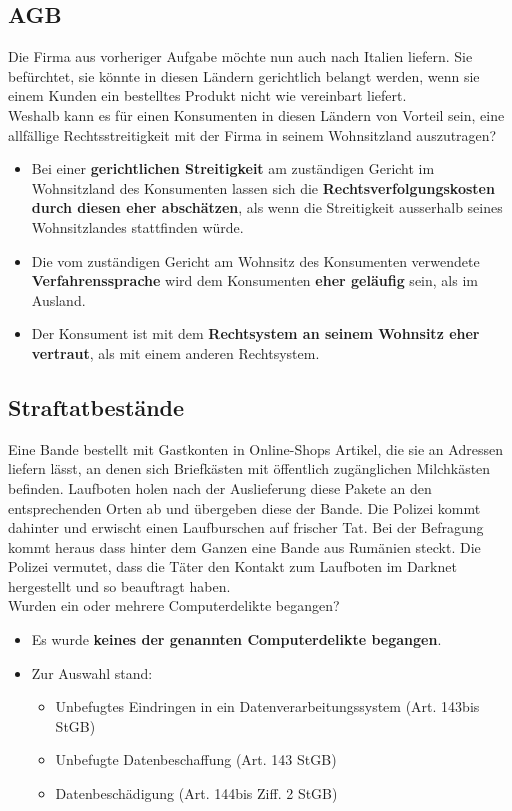 \subsection{AGB}
Die Firma aus vorheriger Aufgabe möchte nun auch nach Italien liefern. Sie befürchtet, sie könnte in diesen Ländern gerichtlich belangt werden, wenn sie einem Kunden ein bestelltes Produkt nicht wie vereinbart liefert.\\
Weshalb kann es für einen Konsumenten in diesen Ländern von Vorteil sein, eine allfällige Rechtsstreitigkeit mit der Firma in seinem Wohnsitzland auszutragen?
\begin{itemize}
	\item Bei einer \textbf{gerichtlichen Streitigkeit} am zuständigen Gericht im Wohnsitzland des Konsumenten lassen sich die \textbf{Rechtsverfolgungskosten durch diesen eher abschätzen}, als wenn die Streitigkeit ausserhalb seines Wohnsitzlandes stattfinden würde.
	\item Die vom zuständigen Gericht am Wohnsitz des Konsumenten verwendete \textbf{Verfahrenssprache} wird dem Konsumenten \textbf{eher geläufig} sein, als im Ausland.
	\item Der Konsument ist mit dem \textbf{Rechtsystem an seinem Wohnsitz eher vertraut}, als mit einem anderen Rechtsystem.
\end{itemize}

\subsection{Straftatbestände}
Eine Bande bestellt mit Gastkonten in Online-Shops Artikel, die sie an Adressen liefern lässt, an denen sich Briefkästen mit öffentlich zugänglichen Milchkästen befinden. Laufboten holen nach der Auslieferung diese Pakete an den entsprechenden Orten ab und übergeben diese der Bande. Die Polizei kommt dahinter und erwischt einen Laufburschen auf frischer Tat. Bei der Befragung kommt heraus dass hinter dem Ganzen eine Bande aus Rumänien steckt. Die Polizei vermutet, dass die Täter den Kontakt zum Laufboten im Darknet hergestellt und so beauftragt haben.\\
Wurden ein oder mehrere Computerdelikte begangen?
\begin{itemize}
	\item Es wurde \textbf{keines der genannten Computerdelikte begangen}.
	\item Zur Auswahl stand:
	\begin{itemize}
		\item Unbefugtes Eindringen in ein Datenverarbeitungssystem (Art. 143bis StGB)
		\item Unbefugte Datenbeschaffung (Art. 143 StGB)
		\item Datenbeschädigung (Art. 144bis Ziff. 2 StGB)
	\end{itemize}
\end{itemize}